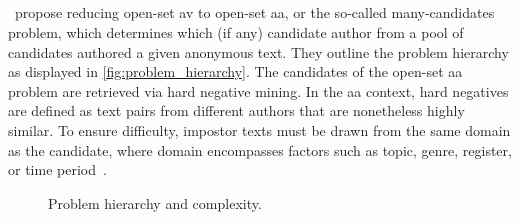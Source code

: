 \subsection{\impApprTitle{}}
\label{sec:impostor_method_theory}

\citet{koppel_determining_2014}\ propose reducing open-set \ac{av} to open-set \ac{aa}, or the so-called many-candidates problem, which determines which (if any) candidate author from a pool of candidates authored a given anonymous text. 
They outline the problem hierarchy as displayed in \autoref{fig:problem_hierarchy}.
The candidates of the open-set \ac{aa} problem are retrieved via hard negative mining. 
In the \ac{aa} context, hard negatives are defined as text pairs from different authors that are nonetheless highly similar. 
To ensure difficulty, impostor texts must be drawn from the same domain as the candidate, where domain encompasses factors such as topic, genre, register, or time period~\citep{bischoff_importance_2020}. 

\begin{figure}[htbp]
    \centering
    
    \caption{Problem hierarchy and complexity.}
    \label{fig:problem_hierarchy}
\end{figure}










